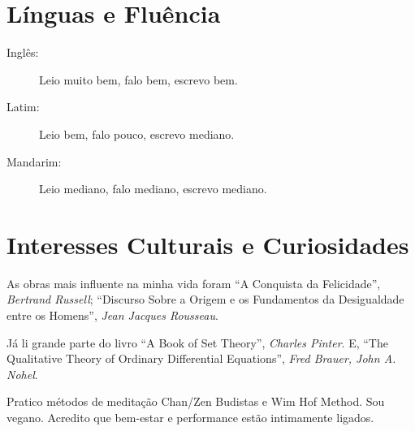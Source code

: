 \documentclass[letterpaper]{twentysecondcv} %
\makeatletter
\def\py@yunpriv#1{%
  \if a#1 10\else
  \if o#1 9\else
  \if e#1 8\else
  \if i#1 7\else
  \if u#1 6\else
  \if v#1 5\else
  \if A#1 4\else
  \if O#1 3\else
  \if E#1 2\fi\fi\fi\fi\fi\fi\fi\fi\fi0
}
\def\py@init{%
  \edef\py@befirst{}%
  \edef\py@char{}\edef\py@tuneletter{}%
  \def\py@last{}%
  \def\py@tune{5}%
}
\def\pinyin#1{%
  \edef\py@postscan{#1}%
  \py@init
  \loop
  \edef\py@char{\expandafter\@car\py@postscan\@nil}%
  \edef\py@postscan{\expandafter\@cdr\py@postscan\@nil}%
  \ifnum 0 < 0\py@char
    \edef\py@tune{\py@char}%
    \py@first \py@tuneat\py@tuneletter\py@tune \py@last\kern -4sp\kern 4sp{}\py@init
  \else
    \ifnum\py@yunpriv\py@char > \py@yunpriv\py@tuneletter
      \edef\py@tuneletter{\py@char}\edef\py@first{\py@befirst}\def\py@last{}%
    \else
      \edef\py@last{\py@last\if v\py@char\"u\else\py@char\fi}%
    \fi
    \edef\py@befirst{\py@befirst\if v\py@char\"u\else\py@char\fi}%
  \fi
  \ifx\py@postscan\@empty\else
  \repeat
}
\let\py@macron \=
\let\py@acute \'
\let\py@hacek \v
\let\py@grave \`
\def\py@tuneat#1#2{%
  \if v#1%
    \py@tune@v #2%
  \else
  \if i#1%
    \py@tune@i #2%
  \else
    \ifcase#2%
      \or\py@macron #1\or\py@acute #1\or\py@hacek #1\or\py@grave #1\else #1%
    \fi
  \fi\fi
}
\def\py@tune@v#1{{%
    \dimen@ii 1ex%
    \fontdimen5\font 1.1ex%
    \rlap{\"u}%
    \fontdimen5\font .6ex%
    \ifcase#1%
      \or\py@macron u\or\py@acute u\or\py@hacek u\or\py@grave u\else u%
    \fi
    \fontdimen5\font\dimen@ii
  }}
\def\py@tune@i#1{%
  \ifcase#1
    \or\py@macron \i\or\py@acute \i\or\py@hacek \i\or\py@grave \i\else i%
  \fi
}
\makeatother
\begin{document}
\section{Línguas e Fluência}

\begin{description}
\item[Inglês:]Leio muito bem, falo bem, escrevo bem.
\item[Latim:] Leio bem, falo pouco, escrevo mediano.
\item[Mandarim:] Leio mediano, falo mediano, escrevo mediano.
\end{description}

\vspace{0.2cm}

\section{Interesses Culturais e Curiosidades}

\vspace{0.05mm}

As obras mais influente na minha vida foram ``A
Conquista da Felicidade'', \textit{Bertrand Russell}; ``Discurso Sobre
a Origem e os Fundamentos da Desigualdade entre os Homens'',
\textit{Jean Jacques Rousseau}.

Já li grande parte do livro ``A Book of Set Theory'', \textit{Charles
  Pinter}. E, ``The Qualitative Theory of Ordinary Differential
Equations'', \textit{Fred Brauer, John A. Nohel}.

Pratico métodos de meditação Chan/Zen Budistas e Wim Hof Method. Sou
vegano. Acredito que bem-estar e performance estão intimamente
ligados.
\end{document}
